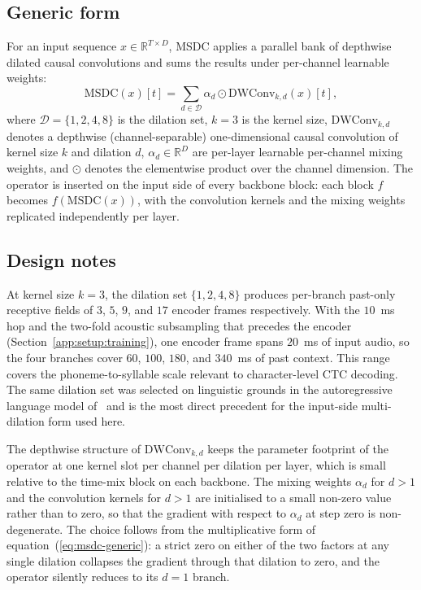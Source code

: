 \subsection{Generic form}

For an input sequence $x \in \mathbb{R}^{T \times D}$, MSDC applies a
parallel bank of depthwise dilated causal convolutions and sums the
results under per-channel learnable weights:
\begin{equation}\label{eq:msdc-generic}
\mathrm{MSDC}(x)[t] = \sum_{d \in \mathcal{D}} \alpha_{d} \odot \mathrm{DWConv}_{k, d}(x)[t],
\end{equation}
where $\mathcal{D} = \{1, 2, 4, 8\}$ is the dilation set, $k = 3$ is
the kernel size, $\mathrm{DWConv}_{k, d}$ denotes a depthwise
(channel-separable) one-dimensional causal convolution of kernel size
$k$ and dilation $d$, $\alpha_{d} \in \mathbb{R}^{D}$ are per-layer
learnable per-channel mixing weights, and $\odot$ denotes the
elementwise product over the channel dimension. The operator is
inserted on the input side of every backbone block: each block $f$
becomes $f(\mathrm{MSDC}(x))$, with the convolution kernels and the
mixing weights replicated independently per layer.

\subsection{Design notes}

At kernel size $k = 3$, the dilation set $\{1, 2, 4, 8\}$
produces per-branch past-only receptive fields of $3$, $5$, $9$,
and $17$ encoder frames respectively. With the $10$~ms hop and
the two-fold acoustic subsampling that precedes the encoder
(Section~\ref{app:setup:training}), one encoder frame spans
$20$~ms of input audio, so the four branches cover $60$, $100$,
$180$, and $340$~ms of past context. This range covers the
phoneme-to-syllable scale relevant to character-level CTC
decoding. The same dilation set was
selected on linguistic grounds in the autoregressive language model
of~\citet{kiruluta2025breaking} and is the most direct precedent for
the input-side multi-dilation form used here.

The depthwise structure of $\mathrm{DWConv}_{k, d}$ keeps the
parameter footprint of the operator at one kernel slot per channel
per dilation per layer, which is small relative to the time-mix
block on each backbone. The mixing weights $\alpha_{d}$ for $d > 1$
and the convolution kernels for $d > 1$ are initialised to a small
non-zero value rather than to zero, so that the gradient with respect
to $\alpha_{d}$ at step zero is non-degenerate. The choice follows
from the multiplicative form of equation~(\ref{eq:msdc-generic}): a
strict zero on either of the two factors at any single dilation
collapses the gradient through that dilation to zero, and the
operator silently reduces to its $d = 1$ branch.


